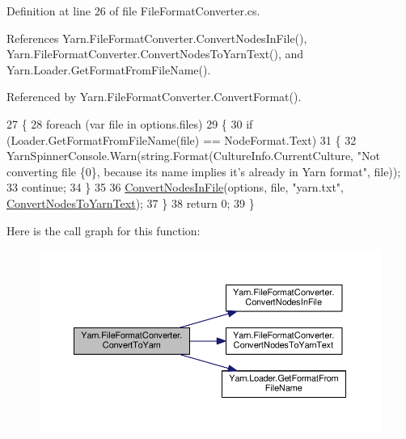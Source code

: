 Definition at line 26 of file File\-Format\-Converter.\-cs.



References Yarn.\-File\-Format\-Converter.\-Convert\-Nodes\-In\-File(), Yarn.\-File\-Format\-Converter.\-Convert\-Nodes\-To\-Yarn\-Text(), and Yarn.\-Loader.\-Get\-Format\-From\-File\-Name().



Referenced by Yarn.\-File\-Format\-Converter.\-Convert\-Format().


\begin{DoxyCode}
27         \{
28             \textcolor{keywordflow}{foreach} (var file \textcolor{keywordflow}{in} options.files)
29             \{
30                 \textcolor{keywordflow}{if} (Loader.GetFormatFromFileName(file) == NodeFormat.Text)
31                 \{
32                     YarnSpinnerConsole.Warn(string.Format(CultureInfo.CurrentCulture, \textcolor{stringliteral}{"Not converting file
       \{0\}, because its name implies it's already in Yarn format"}, file));
33                     \textcolor{keywordflow}{continue};
34                 \}
35 
36                 \hyperlink{a00102_aa72838be584177b5592c31d73c0febdb}{ConvertNodesInFile}(options, file, \textcolor{stringliteral}{"yarn.txt"}, 
      \hyperlink{a00102_a282f283f02c9b1d3e53d813ec2f35233}{ConvertNodesToYarnText});
37             \}
38             \textcolor{keywordflow}{return} 0;
39         \}
\end{DoxyCode}


Here is the call graph for this function\-:
\nopagebreak
\begin{figure}[H]
\begin{center}
\leavevmode
\includegraphics[width=350pt]{a00102_a1e6cd39b0c813f21da278367dcff76d2_cgraph}
\end{center}
\end{figure}




